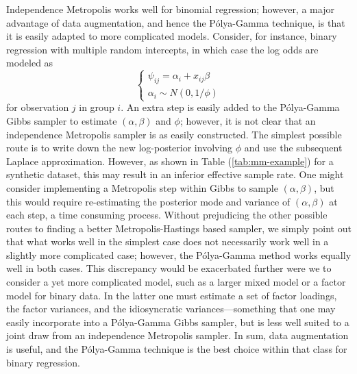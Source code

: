 \documentclass{article}
\newcommand{\Polya}{P\'{o}lya}
\begin{document}


Independence Metropolis works well for binomial regression; however, a major
advantage of data augmentation, and hence the \Polya-Gamma technique, is that it
is easily adapted to more complicated models.  Consider, for instance, binary
regression with multiple random intercepts, in which case the log odds are
modeled as
\[
\begin{cases}
\psi_{ij} = \alpha_i + x_{ij} \beta \\
\alpha_i \sim N(0, 1/\phi)
\end{cases}
\]
for observation $j$ in group $i$.  An extra step is easily added to the
\Polya-Gamma Gibbs sampler to estimate $(\alpha, \beta)$ and $\phi$; however, it
is not clear that an independence Metropolis sampler is as easily constructed.
The simplest possible route is to write down the new log-posterior involving
$\phi$ and use the subsequent Laplace approximation.  However, as shown in Table
(\ref{tab:mm-example}) for a synthetic dataset, this may result in an inferior
effective sample rate.  One might consider implementing a Metropolis step within
Gibbs to sample $(\alpha,\beta)$, but this would require re-estimating the
posterior mode and variance of $(\alpha,\beta)$ at each step, a time consuming
process.  Without prejudicing the other possible routes to finding a better
Metropolis-Hastings based sampler, we simply point out that what works well in
the simplest case does not necessarily work well in a slightly more complicated
case; however, the \Polya-Gamma method works equally well in both cases.  This
discrepancy would be exacerbated further were we to consider a yet more
complicated model, such as a larger mixed model or a factor model for binary
data.  In the latter one must estimate a set of factor loadings, the factor
variances, and the idiosyncratic variances---something that one may easily
incorporate into a \Polya-Gamma Gibbs sampler, but is less well suited to a
joint draw from an independence Metropolis sampler.  In sum, data augmentation
is useful, and the \Polya-Gamma technique is the best choice within that class
for binary regression.
\end{document}
